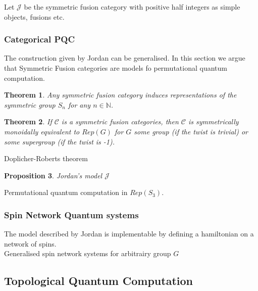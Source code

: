 \documentclass{article}
\newtheorem{theorem}{Theorem}[section]
\newtheorem{proposition}[theorem]{Proposition}
\newenvironment{proof}[1][Proof]{\begin{trivlist}
\item[\hskip \labelsep {\bfseries #1}]}{\end{trivlist}}
\newenvironment{definition}[1][Definition]{\begin{trivlist}
\item[\hskip \labelsep {\bfseries #1}]}{\end{trivlist}}
\newenvironment{example}[1][Example]{\begin{trivlist}
\item[\hskip \labelsep {\bfseries #1}]}{\end{trivlist}}
\begin{document}
\begin{definition}
Let $\mathcal{J}$ be the symmetric fusion category with positive half integers as simple objects, fusions etc.
\end{definition}

\subsubsection{Categorical PQC}
The construction given by Jordan can be generalised. In this section we argue that Symmetric Fusion categories are models fo permutational quantum computation.

\begin{theorem}
Any symmetric fusion category induces representations of the symmetric group $S_n$ for any $n\in \mathbb{N}$.
\end{theorem}

\begin{theorem}
If $\mathcal{C}$ is a symmetric fusion categories, then $\mathcal{C}$ is symmetrically monoidally equivalent to $Rep(G)$ for $G$ some group (if the twist is trivial) or some supergroup (if the twist is -1).
\end{theorem}
\begin{proof}
Doplicher-Roberts theorem
\end{proof}

\begin{proposition}
Jordan's model $\mathcal{J}$
\end{proposition}
\begin{example}
Permutational quantum computation in $Rep(S_3)$.
\end{example}

\subsubsection{Spin Network Quantum systems}
The model described by Jordan is implementable by defining a hamiltonian on a network of spins.\\
Generalised spin network systems for arbitrairy group $G$



\subsection{Topological Quantum Computation}
\end{document}
